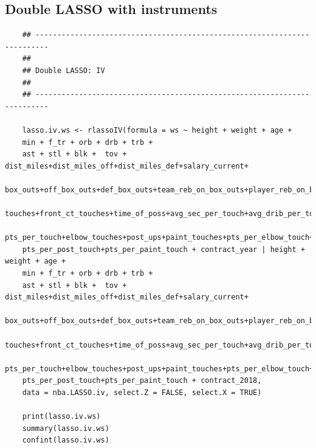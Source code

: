 \documentclass[12pt]{article}
\begin{document}
	\subsection{Double LASSO with instruments}
	
	\begin{lstlisting}
	## -------------------------------------------------------------------------
	##
	## Double LASSO: IV
	##
	## -------------------------------------------------------------------------
	
	lasso.iv.ws <- rlassoIV(formula = ws ~ height + weight + age +
	min + f_tr + orb + drb + trb +
	ast + stl + blk +  tov + dist_miles+dist_miles_off+dist_miles_def+salary_current+
	box_outs+off_box_outs+def_box_outs+team_reb_on_box_outs+player_reb_on_box_outs+
	touches+front_ct_touches+time_of_poss+avg_sec_per_touch+avg_drib_per_touch+
	pts_per_touch+elbow_touches+post_ups+paint_touches+pts_per_elbow_touch+
	pts_per_post_touch+pts_per_paint_touch + contract_year | height + weight + age +
	min + f_tr + orb + drb + trb +
	ast + stl + blk +  tov + dist_miles+dist_miles_off+dist_miles_def+salary_current+
	box_outs+off_box_outs+def_box_outs+team_reb_on_box_outs+player_reb_on_box_outs+
	touches+front_ct_touches+time_of_poss+avg_sec_per_touch+avg_drib_per_touch+
	pts_per_touch+elbow_touches+post_ups+paint_touches+pts_per_elbow_touch+
	pts_per_post_touch+pts_per_paint_touch + contract_2018,
	data = nba.LASSO.iv, select.Z = FALSE, select.X = TRUE)
	
	print(lasso.iv.ws)
	summary(lasso.iv.ws)
	confint(lasso.iv.ws)
	\end{lstlisting}
	
	
	\clearpage
	
	
\end{document}
